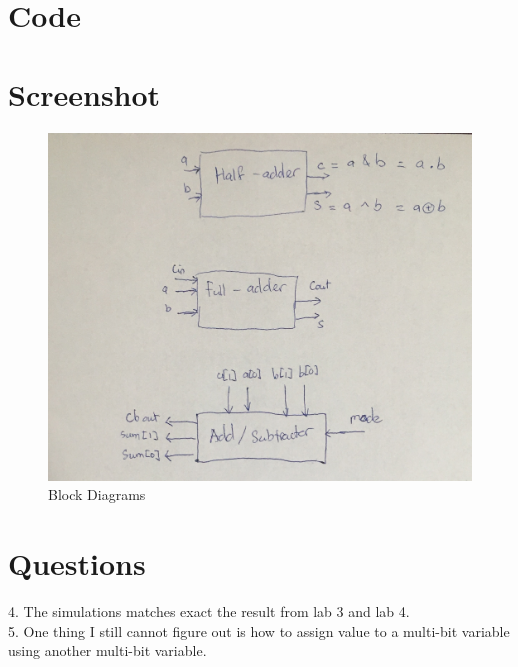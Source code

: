 \documentclass[11pt]{article}
\newcommand{\Verilog}[2][]{%
	
}
\begin{document}
\section*{Code}
\Verilog[firstline=23, caption=Half Adder Implementation]{../verilog_code/half_adder.sv}
\Verilog[firstline=23,caption=Half Adder Test Bench]{../verilog_code/half_adder_test.v}
\Verilog[firstline=23,caption=Full Adder Implementation]{../verilog_code/full_adder.v}
\Verilog[firstline=23,caption=Full Adder Test Bench]{../verilog_code/full_adder_test.sv}
\Verilog[firstline=23,caption=2-bit Adder/Subtractor Implementation]{../verilog_code/adder_subtractor.sv}
\Verilog[firstline=23,caption=2-bit Adder/Subtractor Test Bench]{../verilog_code/adder_subtractor_test.sv}
\section*{Screenshot}
\begin{figure}[ht]
	\centering
	\includegraphics[width=\textwidth]{"lab5_block_diagram"}
	\caption{Block Diagrams}
\end{figure}

\section*{Questions}
4. The simulations matches exact the result from lab 3 and lab 4. \\
5. One thing I still cannot figure out is how to assign value to a multi-bit variable using another multi-bit variable.
\end{document}
